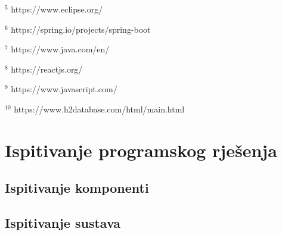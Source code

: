 			${}^{5}$ https://www.eclipse.org/
			
			${}^{6}$ https://spring.io/projects/spring-boot
			
			${}^{7}$ https://www.java.com/en/
			
			${}^{8}$ https://reactjs.org/
			
			${}^{9}$ https://www.javascript.com/
			
			${}^{10}$ https://www.h2database.com/html/main.html
			
			\eject 

		
	
		\section{Ispitivanje programskog rješenja}
			
%			
	
			
			\subsection{Ispitivanje komponenti}
			
			
			
			\subsection{Ispitivanje sustava}
			
